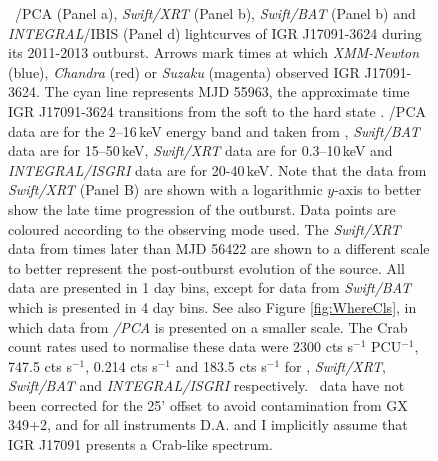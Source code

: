 \begin{figure}
    \caption[Lightcurves of IGR J17091-3624, from a number of instruments, during its 2011-2013 outburst.]{\indexrxte\indexpca\rxte\ /PCA (Panel a), \indexswift\indexxrt\textit{Swift/XRT} (Panel b), \indexbat\textit{Swift/BAT} (Panel b) and \indexintegral\indexibis\textit{INTEGRAL}/IBIS (Panel d) lightcurves of IGR J17091-3624 during its 2011-2013 outburst.  Arrows mark times at which \indexxmm\textit{XMM-Newton} (blue), \indexchandra\textit{Chandra} (red) or \indexsuzaku\textit{Suzaku} (magenta) observed IGR J17091-3624.  The cyan line represents MJD 55963, the approximate time IGR J17091-3624 transitions from the soft to the hard state \citep{Drave_Return}.  \rxte /PCA \citep{Jahoda_PCA} data are for the 2--16\,keV energy band and taken from \citep{Altamirano_IGR_FH}, \textit{Swift/BAT} \citep{Barthelmy_BAT} data are for 15--50\,keV, \textit{Swift/XRT} \citep{Burrows_XRT}  data are for 0.3--10\,keV and \textit{INTEGRAL/ISGRI} \citep{Ubertini_IBIS} data are for 20-40\,keV.  Note that the data from \textit{Swift/XRT} (Panel B) are shown with a logarithmic $y$-axis to better show the late time progression of the outburst.  Data points are coloured according to the observing mode used.  The \textit{Swift/XRT} data from times later than MJD 56422 are shown to a different scale to better represent the post-outburst evolution of the source.  All data are presented in 1 day bins, except for data from \textit{Swift/BAT} which is presented in 4 day bins.  See also Figure \ref{fig:WhereCls}, in which data from \rxte \textit{/PCA} is presented on a smaller scale.  The Crab count rates used to normalise these data were 2300 cts s$^{-1}$ PCU$^{-1}$, 747.5 cts s$^{-1}$, 0.214 cts s$^{-1}$ and 183.5 cts s$^{-1}$ for \rxte , \textit{Swift/XRT}, \textit{Swift/BAT} and \textit{INTEGRAL/ISGRI} respectively.  \rxte\ data have not been corrected for the 25' offset to avoid contamination from GX 349+2, and for all instruments \textsf{D.A.} and I implicitly assume that IGR J17091 presents a Crab-like spectrum.}
   \label{fig:allmissions}
\end{figure}

\subsection{\rxte}

\label{sec:XTEDA}

